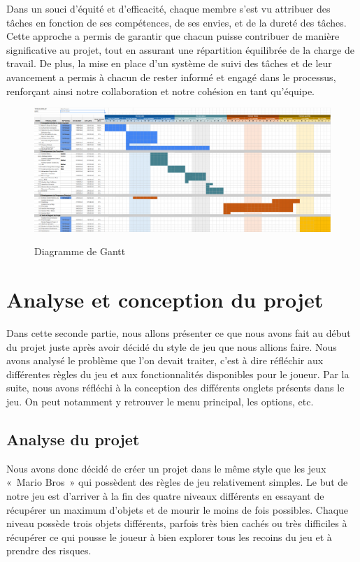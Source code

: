 \documentclass[12pt,a4paper]{article}
\begin{document}
            Dans un souci d'équité et d'efficacité, chaque membre s'est vu attribuer des tâches en fonction de ses compétences, de ses envies, et de la dureté des tâches. Cette approche a permis de garantir que chacun puisse contribuer de manière significative au projet, tout en assurant une répartition équilibrée de la charge de travail. De plus, la mise en place d'un système de suivi des tâches et de leur avancement a permis à chacun de rester informé et engagé dans le processus, renforçant ainsi notre collaboration et notre cohésion en tant qu'équipe.\\

            \begin{figure}[h]
                \centering
                \includegraphics[width=13cm]{images/diagramme_GANTT.png}\\
                \caption{Diagramme de Gantt}
            \end{figure}

    \newpage
    
    \section{Analyse et conception du projet}
        \tabto{1cm} Dans cette seconde partie, nous allons présenter ce que nous avons fait au début du projet juste après avoir décidé du style de jeu que nous allions faire. Nous avons analysé le problème que l'on devait traiter, c'est à dire réfléchir aux différentes règles du jeu et aux fonctionnalités disponibles pour le joueur. Par la suite, nous avons réfléchi à la conception des différents onglets présents dans le jeu. On peut notamment y retrouver le menu principal, les options, etc.

        \subsection{Analyse du projet}
            \tabto{1cm} Nous avons donc décidé de créer un projet dans le même style que les jeux «~Mario Bros~» qui possèdent des règles de jeu relativement simples. Le but de notre jeu est d’arriver à la fin des quatre niveaux différents en essayant de récupérer un maximum d’objets et de mourir le moins de fois possibles. Chaque niveau possède trois objets différents, parfois très bien cachés ou très difficiles à récupérer ce qui pousse le joueur à bien explorer tous les recoins du jeu et à prendre des risques.\\
\end{document}
